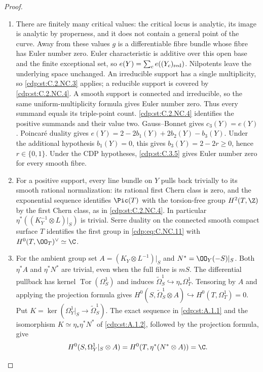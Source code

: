 \begin{proof}

\begin{enumerate}[label=\arabic*.,leftmargin=*]
\item There are finitely many critical values: the critical locus is analytic, its image is analytic by properness, and it does not contain a general point of the curve. Away from these values $g$ is a differentiable fibre bundle whose fibre has Euler number zero. Euler characteristic is additive over this open base and the finite exceptional set, so $e(Y)=\sum_c e((Y_c)_{\rm red})$. Nilpotents leave the underlying space unchanged. An irreducible support has a single multiplicity, so \ref{cdp:st:C.2.NC.3} applies; a reducible support is covered by \ref{cdp:st:C.2.NC.4}. A smooth support is connected and irreducible, so the same uniform-multiplicity formula gives Euler number zero. Thus every summand equals its triple-point count. \ref{cdp:st:C.2.NC.4} identifies the positive summands and their value two. Gauss--Bonnet gives $c_3(Y)=e(Y)$. Poincaré duality gives $e(Y)=2-2b_1(Y)+2b_2(Y)-b_3(Y)$. Under the additional hypothesis $b_1(Y)=0$, this gives $b_3(Y)=2-2r\ge0$, hence $r\in\{0,1\}$. Under the CDP hypotheses, \ref{cdp:st:C.3.5} gives Euler number zero for every smooth fibre.

\item For a positive support, every line bundle on $Y$ pulls back trivially to its smooth rational normalization: its rational first Chern class is zero, and the exponential sequence identifies $\Pic(T)$ with the torsion-free group $H^2(T,\Z)$ by the first Chern class, as in \ref{cdp:st:C.2.NC.4}. In particular $\eta^*((K_Y^{-1}\otimes L)|_S)$ is trivial. Serre duality on the connected smooth compact surface $T$ identifies the first group in \eqref{cdp:eq:C.NC.11} with $H^0(T,\OO_T)^\vee\simeq\C$.

\item For the ambient group set $A=(K_Y\otimes L^{-1})|_S$ and $N^*=\OO_Y(-S)|_S$. Both $\eta^*A$ and $\eta^*N^*$ are trivial, even when the full fibre is $mS$. The differential pullback has kernel $\operatorname{Tor}(\Omega_S^1)$ and induces $\widetilde\Omega_S^1\hookrightarrow\eta_*\Omega_T^1$. Tensoring by $A$ and applying the projection formula gives
$H^0(S,\widetilde\Omega_S^1\otimes A)\hookrightarrow H^0(T,\Omega_T^1)=0$.
Put $K=\ker(\Omega_Y^1|_S\to\widetilde\Omega_S^1)$. The exact sequence in \ref{cdp:st:A.1.1} and the isomorphism $K\simeq\eta_*\eta^*N^*$ of \ref{cdp:st:A.1.2}, followed by the projection formula, give
\[
 H^0(S,\Omega_Y^1|_S\otimes A)
 =H^0(T,\eta^*(N^*\otimes A))=\C.
\]


\end{enumerate}
\end{proof}